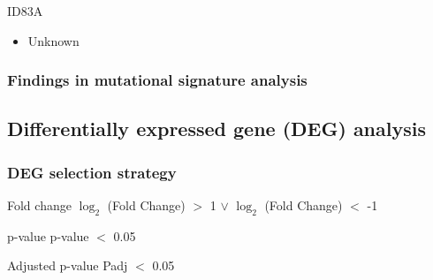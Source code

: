 \documentclass{beamer}
\begin{document}
\begin{frame}
                    \begin{block}{ID83A}
                        \begin{itemize}
                            \item Unknown
                        \end{itemize}
                    \end{block}
                \end{frame}

            \begin{frame}
                \frametitle{Findings in mutational signature analysis}
            \end{frame}

        \subsection{Differentially expressed gene (DEG) analysis}
            \begin{frame}
                \frametitle{DEG selection strategy}

                \begin{block}{Fold change}
                    $\log_2$ (Fold Change) $>$ 1 $\vee$ $\log_2$ (Fold Change) $<$ -1
                \end{block}

                \begin{block}{p-value}
                    p-value $<$ 0.05
                \end{block}

                \begin{block}{Adjusted p-value}
                    Padj $<$ 0.05
                \end{block}
            \end{frame}
\end{document}
